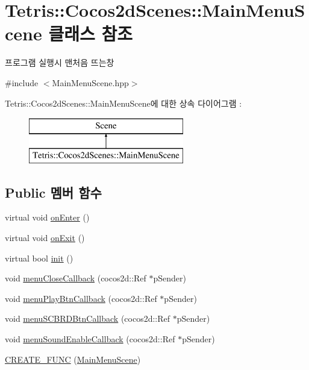 \hypertarget{class_tetris_1_1_cocos2d_scenes_1_1_main_menu_scene}{}\section{Tetris\+:\+:Cocos2d\+Scenes\+:\+:Main\+Menu\+Scene 클래스 참조}
\label{class_tetris_1_1_cocos2d_scenes_1_1_main_menu_scene}


프로그램 실행시 맨처음 뜨는창  




{\ttfamily \#include $<$Main\+Menu\+Scene.\+hpp$>$}

Tetris\+:\+:Cocos2d\+Scenes\+:\+:Main\+Menu\+Scene에 대한 상속 다이어그램 \+: \begin{figure}[H]
\begin{center}
\leavevmode
\includegraphics[height=2.000000cm]{class_tetris_1_1_cocos2d_scenes_1_1_main_menu_scene}
\end{center}
\end{figure}
\subsection*{Public 멤버 함수}
\begin{DoxyCompactItemize}
\item 
virtual void \hyperlink{class_tetris_1_1_cocos2d_scenes_1_1_main_menu_scene_a63cfd0adc032b868536a89b103c44fc5}{on\+Enter} ()
\item 
virtual void \hyperlink{class_tetris_1_1_cocos2d_scenes_1_1_main_menu_scene_a021af73aac74c3e90113812882b3e0bb}{on\+Exit} ()
\item 
virtual bool \hyperlink{class_tetris_1_1_cocos2d_scenes_1_1_main_menu_scene_ae4d89ddd3650f5f24e86ea631092ecb9}{init} ()
\item 
void \hyperlink{class_tetris_1_1_cocos2d_scenes_1_1_main_menu_scene_a9bf1239efe00c6fda79c4d080d9a08aa}{menu\+Close\+Callback} (cocos2d\+::\+Ref $\ast$p\+Sender)
\item 
void \hyperlink{class_tetris_1_1_cocos2d_scenes_1_1_main_menu_scene_a19f4cf80f17731583bec6a25d8de5acd}{menu\+Play\+Btn\+Callback} (cocos2d\+::\+Ref $\ast$p\+Sender)
\item 
void \hyperlink{class_tetris_1_1_cocos2d_scenes_1_1_main_menu_scene_a2fdee3d586584f0186569ccd13d2d7fc}{menu\+S\+C\+B\+R\+D\+Btn\+Callback} (cocos2d\+::\+Ref $\ast$p\+Sender)
\item 
void \hyperlink{class_tetris_1_1_cocos2d_scenes_1_1_main_menu_scene_a0a6113964573664add11cd1e08ffdd03}{menu\+Sound\+Enable\+Callback} (cocos2d\+::\+Ref $\ast$p\+Sender)
\item 
\hyperlink{class_tetris_1_1_cocos2d_scenes_1_1_main_menu_scene_a16e190dfef8b0c64f1c5bb03880dd8f7}{C\+R\+E\+A\+T\+E\+\_\+\+F\+U\+NC} (\hyperlink{class_tetris_1_1_cocos2d_scenes_1_1_main_menu_scene}{Main\+Menu\+Scene})
\end{DoxyCompactItemize}
